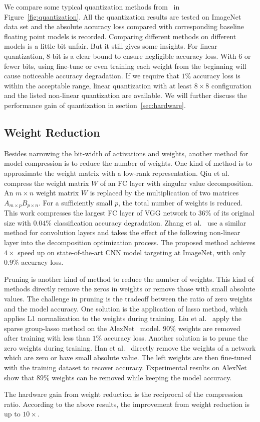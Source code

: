 We compare some typical quantization methods from~\cite{qiu2016going, guo2017angel, han2015deep, zhu2016trained, zhou2016dorefa, li2016ternary} in Figure~\ref{fig:quantization}. All the quantization results are tested on ImageNet data set and the absolute accuracy loss compared with corresponding baseline floating point models is recorded. Comparing different methods on different models is a little bit unfair. But it still gives some insights. For linear quantization, 8-bit is a clear bound to ensure negligible accuracy loss. With 6 or fewer bits, using fine-tune or even training each weight from the beginning will cause noticeable accuracy degradation. If we require that $1\%$ accuracy loss is within the acceptable range, linear quantization with at least $8\times 8$ configuration and the listed non-linear quantization are available. We will further discuss the performance gain of quantization in section~\ref{sec:hardware}. 


\subsection{Weight Reduction}\label{sec:software:wr}
Besides narrowing the bit-width of activations and weights, another method for model compression is to reduce the number of weights. One kind of method is to approximate the weight matrix with a low-rank representation. Qiu et al.~\cite{qiu2016going} compress the weight matrix $W$ of an FC layer with singular value decomposition. An $m\times n$ weight matrix $W$ is replaced by the multiplication of two matrices $A_{m\times p}B_{p\times n}$. For a sufficiently small $p$, the total number of weights is reduced. This work compresses the largest FC layer of VGG network to $36\%$ of its original size with $0.04\%$ classification accuracy degradation. Zhang et al.~\cite{zhang2015efficient} use a similar method for convolution layers and takes the effect of the following non-linear layer into the decomposition optimization process. The proposed method achieves $4\times$ speed up on state-of-the-art CNN model targeting at ImageNet, with only $0.9\%$ accuracy loss.

Pruning is another kind of method to reduce the number of weights. This kind of methods directly remove the zeros in weights or remove those with small absolute values. The challenge in pruning is the tradeoff between the ratio of zero weights and the model accuracy. One solution is the application of lasso method, which applies L1 normalization to the weights during training. Liu et al.~\cite{liu2015sparse} apply the sparse group-lasso method on the AlexNet~\cite{krizhevsky2012imagenet} model. $90\%$ weights are removed after training with less than $1\%$ accuracy loss. Another solution is to prune the zero weights during training. Han et al.~\cite{han2015deep} directly remove the weights of a network which are zero or have small absolute value. The left weights are then fine-tuned with the training dataset to recover accuracy. Experimental results on AlexNet show that $89\%$ weights can be removed while keeping the model accuracy.

The hardware gain from weight reduction is the reciprocal of the compression ratio. According to the above results, the improvement from weight reduction is up to $10\times$.